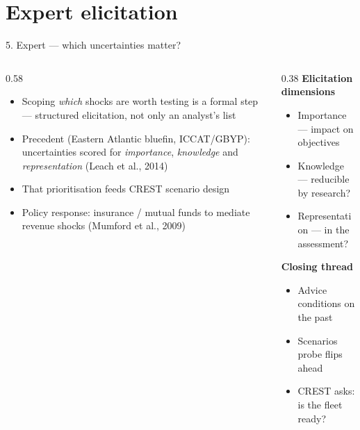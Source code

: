 \documentclass[12pt,aspectratio=169]{beamer}
\begin{document}
\section{Expert elicitation}

\begin{frame}{5. Expert --- which uncertainties matter?}
  \begin{columns}[T]
    \begin{column}{0.58\textwidth}
      \begin{itemize}
        \item Scoping \emph{which} shocks are worth testing is a formal step --- structured elicitation, not only an analyst's list
        \item Precedent (Eastern Atlantic bluefin, ICCAT/GBYP): uncertainties scored for \emph{importance}, \emph{knowledge} and \emph{representation} (Leach et al., 2014)
        \item That prioritisation feeds CREST scenario design
        \item Policy response: insurance / mutual funds to mediate revenue shocks (Mumford et al., 2009)
      \end{itemize}
    \end{column}
    \begin{column}{0.38\textwidth}
      \centering
      \textbf{Elicitation dimensions}
      \begin{itemize}
        \item Importance --- impact on objectives
        \item Knowledge --- reducible by research?
        \item Representation --- in the assessment?
      \end{itemize}
      \vspace{3mm}
      \textbf{Closing thread}
      \begin{itemize}
        \item Advice conditions on the past
        \item Scenarios probe flips ahead
        \item CREST asks: is the fleet ready?
      \end{itemize}
    \end{column}
  \end{columns}
\end{frame}
\end{document}
